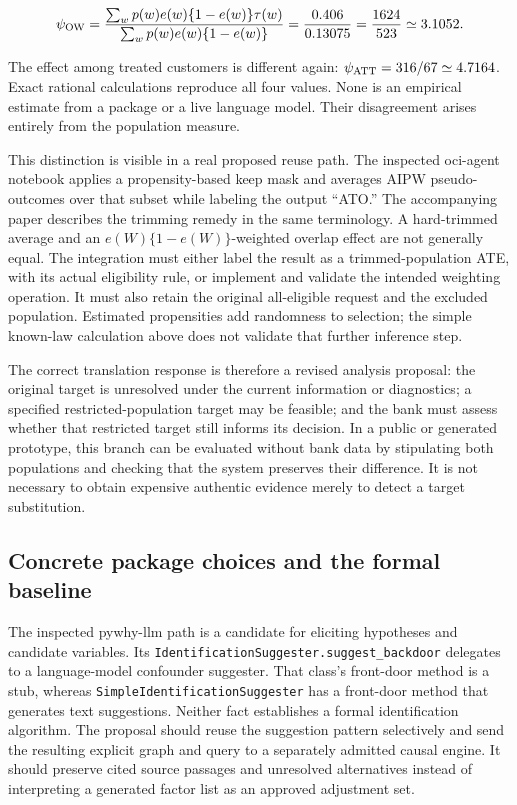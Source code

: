 \[
 \psi_{\rm OW}
 =\frac{\sum_w p(w)e(w)\{1-e(w)\}\tau(w)}
        {\sum_w p(w)e(w)\{1-e(w)\}}
 =\frac{0.406}{0.13075}
 =\frac{1624}{523}\simeq 3.1052.
\]

The effect among treated customers is different again:
\(\psi_{\rm ATT}=316/67\simeq4.7164\). Exact rational calculations
reproduce all four values. None is an empirical estimate from a package
or a live language model. Their disagreement arises entirely from the
population measure. \citep{exec13_formulation_targets}

This distinction is visible in a real proposed reuse path. The inspected
oci-agent notebook applies a propensity-based keep mask and averages
AIPW pseudo-outcomes over that subset while labeling the output ``ATO.''
The accompanying paper describes the trimming remedy in the same
terminology. A hard-trimmed average and an \(e(W)\{1-e(W)\}\)-weighted
overlap effect are not generally equal. The integration must either
label the result as a trimmed-population ATE, with its actual
eligibility rule, or implement and validate the intended weighting
operation. It must also retain the original all-eligible request and the
excluded population. Estimated propensities add randomness to selection;
the simple known-law calculation above does not validate that further
inference step. \citep{v12_la_package_oci_agent,v12_la_2607_22443}

The correct translation response is therefore a revised analysis
proposal: the original target is unresolved under the current
information or diagnostics; a specified restricted-population target may
be feasible; and the bank must assess whether that restricted target
still informs its decision. In a public or generated prototype, this
branch can be evaluated without bank data by stipulating both
populations and checking that the system preserves their difference. It
is not necessary to obtain expensive authentic evidence merely to detect
a target substitution.

\hypertarget{concrete-package-choices-and-the-formal-baseline}{%
\subsection{Concrete package choices and the formal
baseline}\label{concrete-package-choices-and-the-formal-baseline}}

The inspected pywhy-llm path is a candidate for eliciting hypotheses and
candidate variables. Its
\texttt{IdentificationSuggester.suggest\_backdoor} delegates to a
language-model confounder suggester. That class's front-door method is a
stub, whereas \texttt{SimpleIdentificationSuggester} has a front-door
method that generates text suggestions. Neither fact establishes a
formal identification algorithm. The proposal should reuse the
suggestion pattern selectively and send the resulting explicit graph and
query to a separately admitted causal engine. It should preserve cited
source passages and unresolved alternatives instead of interpreting a
generated factor list as an approved adjustment set.
\citep{v12_la_package_pywhy_llm}

